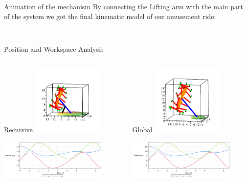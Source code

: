 \documentclass{beamer}              %
\begin{document}
	\begin{frame}{Animation of the mechanism}
		\small
		By connecting the Lifting arm with the main part of the system we got the final kinematic model of our amusement ride:	
			
		\begin{center}
			 \\
		\end{center}
	\end{frame}
	\begin{frame}{Position and Workspace Analysis}
		\begin{columns}
			\begin{column}{0.5\textwidth}
				\begin{block}{\centering Recursive}
					\centering
					\includegraphics[width=100pt]{immagini/position_recursive.png}
					
					\medskip
					
					\includegraphics[width=150pt]{grafici/pos_pass_r.png}
				\end{block}
			\end{column}
			\begin{column}{0.5\textwidth}
				\begin{block}{\centering Global}
					\centering
					\includegraphics[width=100pt]{immagini/position_global.png}
					
					\medskip
					
					\includegraphics[width=150pt]{grafici/pos_pass_g.png}			
				\end{block}	
			\end{column}
		\end{columns}
	\end{frame}	
\end{document}
